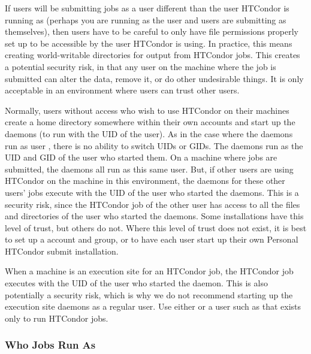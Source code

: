 If users will be submitting jobs as a user different than the user
HTCondor is running as (perhaps you are running as the  user and
users are submitting as themselves), then users have to be careful to
only have file permissions properly set up to be accessible by the
user HTCondor is using. In practice, this means creating world-writable
directories for output from HTCondor jobs.  This creates a potential
security risk, in that any user on the machine where the job is
submitted can alter the data, remove it, or do other undesirable
things.  It is only acceptable in an environment where users can trust
other users.

Normally, users without  access who wish to use HTCondor on their
machines create a  home directory somewhere within their
own accounts and start up the daemons (to run with the UID of the
user).  As in the case where the daemons run as user , there is
no ability to switch UIDs or GIDs.  The daemons run as the UID and GID
of the user who started them.  On a machine where jobs are submitted,
the  daemons all run as this same user. 
But, if other
users are using HTCondor on the machine in this environment, the
 daemons for these other users' jobs execute with the
UID of the user who started the daemons.  This is a security risk,
since the HTCondor job of the other user has access to all the files and
directories of the user who started the daemons.  Some installations
have this level of trust, but others do not.  Where this level of
trust does not exist, it is best to set up a  account and group,
or to have each user start up their own Personal HTCondor submit
installation.

When a machine is an execution site for an HTCondor job, the HTCondor job
executes with the UID of the user who started the 
daemon.  This is also potentially a security risk, which is why we do
not recommend starting up the execution site daemons as a regular
user.  Use either  or a user
such as  that exists
only to run HTCondor jobs.

\subsubsection{\label{sec:RunAsNobody}Who Jobs Run As}

